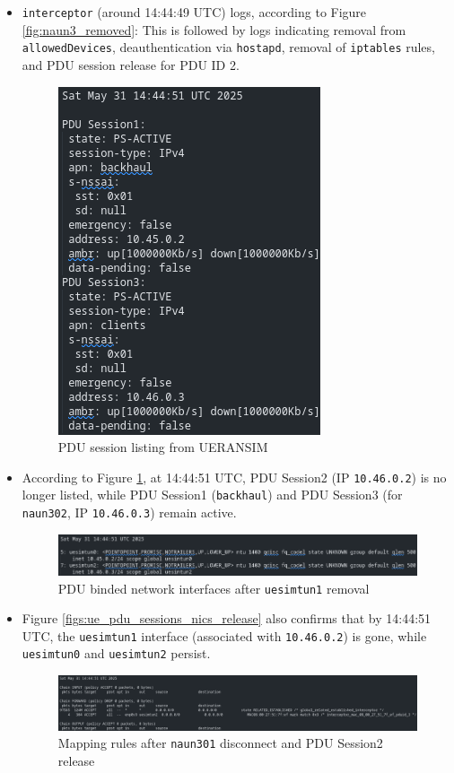 \begin{itemize}
    \item \texttt{interceptor} (around 14:44:49 \ac{UTC}) logs, according to Figure \ref{fig:naun3_removed}:  This is followed by logs indicating removal from \texttt{allowedDevices}, deauthentication via \texttt{hostapd}, removal of \texttt{iptables} rules, and \ac{PDU} session release for \ac{PDU} ID 2.

    \begin{figure}
        \centering
        \includegraphics[width=0.20\linewidth]{figs/nr-cli_ps-list.png}
        \caption{\acs{PDU} session listing from UERANSIM}
        \label{fig:nr-cli_ps-list}
    \end{figure}

    \item According to Figure \ref{fig:nr-cli_ps-list}, at 14:44:51 \ac{UTC}, \ac{PDU} Session2 (\ac{IP} \texttt{10.46.0.2}) is no longer listed, while \ac{PDU} Session1 (\texttt{backhaul}) and \ac{PDU} Session3 (for \texttt{naun302}, \ac{IP} \texttt{10.46.0.3}) remain active.

    \begin{figure}
        \centering
        \includegraphics[width=1\linewidth]{figs/ue_pdu_sessions_nics_release.png}
        \caption{\acs{PDU} binded network interfaces after \texttt{uesimtun1} removal}
        \label{fig:ue_pdu_sessions_nics_release}
    \end{figure}
    
    \item Figure \ref{figs:ue_pdu_sessions_nics_release} also confirms that by 14:44:51 \ac{UTC}, the \texttt{uesimtun1} interface (associated with \texttt{10.46.0.2}) is gone, while \texttt{uesimtun0} and \texttt{uesimtun2} persist.

    \begin{figure}
        \centering
        \includegraphics[width=1\linewidth]{figs/ue_naun3_to_pdu_mapping_rules.png}
        \caption{Mapping rules after \texttt{naun301} disconnect and \acs{PDU} Session2 release}
        \label{fig:ue_naun3_to_pdu_mapping_rules}
    \end{figure}


\end{itemize}
